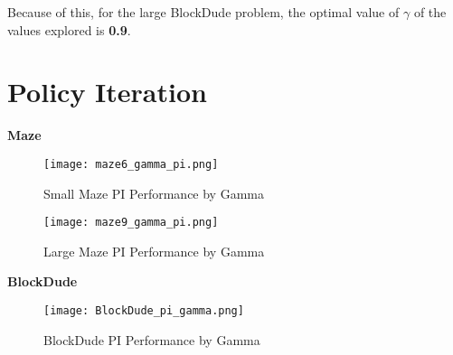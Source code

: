 \documentclass{article}
\begin{document}
Because of this, for the large BlockDude problem, the optimal value of $\gamma$ of the values explored is \textbf{0.9}.


\section{Policy Iteration} \label{PI}

\textbf{Maze}

\begin{figure}
    \centering
    \begin{minipage}{0.5\textwidth}
        \centering
        \texttt{[image: maze6\_gamma\_pi.png]}
        \caption{Small Maze PI Performance by Gamma}
        \label{fig:small-maze-pi}
    \end{minipage}\hfill
    \begin{minipage}{0.5\textwidth}
        \centering
        \texttt{[image: maze9\_gamma\_pi.png]}
        \caption{Large Maze PI Performance by Gamma}
        \label{fig:large-maze-pi}
    \end{minipage}
\end{figure}

\textbf{BlockDude}

\begin{figure}
    \centering
    \label{fig:DT-ccp}
    \texttt{[image: BlockDude\_pi\_gamma.png]}
    \caption{BlockDude PI Performance by Gamma}
\end{figure}
\end{document}
